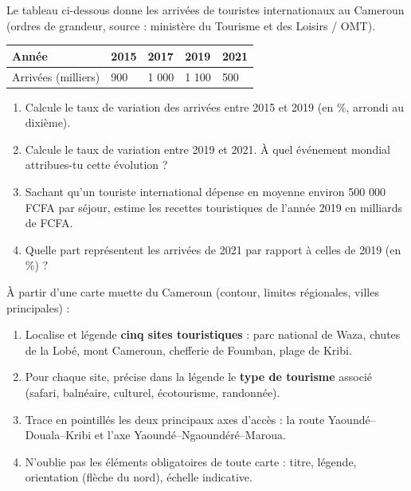 \documentclass[11pt]{article}
\newcounter{popsec}
\newcounter{popsub}
\newcommand{\courssub}[1]{%
  \stepcounter{popsub}%
  \par\vspace{9pt}\noindent{\popxbold\fontsize{11.5}{13}\selectfont\color{popink}{\color{poporange}\thepopsec.\thepopsub}\hspace{6pt}#1}\par\nopagebreak\vspace{4pt}
}
\begin{document}
\begin{exercice}
Le tableau ci-dessous donne les arrivées de touristes internationaux au Cameroun (ordres de grandeur, source : ministère du Tourisme et des Loisirs / OMT).

\begin{center}
\begin{tabularx}{\linewidth}{|l|X|X|X|X|}\hline
\rowcolor{popblueL} \textbf{Année} & \textbf{2015} & \textbf{2017} & \textbf{2019} & \textbf{2021} \\ \hline
Arrivées (milliers) & 900 & 1 000 & 1 100 & 500 \\ \hline
\end{tabularx}
\end{center}

\begin{enumerate}
\item Calcule le taux de variation des arrivées entre 2015 et 2019 (en \%, arrondi au dixième).
\item Calcule le taux de variation entre 2019 et 2021. À quel événement mondial attribues-tu cette évolution ?
\item Sachant qu'un touriste international dépense en moyenne environ 500 000 FCFA par séjour, estime les recettes touristiques de l'année 2019 en milliards de FCFA.
\item Quelle part représentent les arrivées de 2021 par rapport à celles de 2019 (en \%) ?
\end{enumerate}
\end{exercice}

\courssub{Je m'entraîne}

\begin{exercice}
À partir d'une carte muette du Cameroun (contour, limites régionales, villes principales) :

\begin{enumerate}
\item Localise et légende \textbf{cinq sites touristiques} : parc national de Waza, chutes de la Lobé, mont Cameroun, chefferie de Foumban, plage de Kribi.
\item Pour chaque site, précise dans la légende le \textbf{type de tourisme} associé (safari, balnéaire, culturel, écotourisme, randonnée).
\item Trace en pointillés les deux principaux axes d'accès : la route Yaoundé--Douala--Kribi et l'axe Yaoundé--Ngaoundéré--Maroua.
\item N'oublie pas les éléments obligatoires de toute carte : titre, légende, orientation (flèche du nord), échelle indicative.
\end{enumerate}
\end{exercice}
\end{document}
